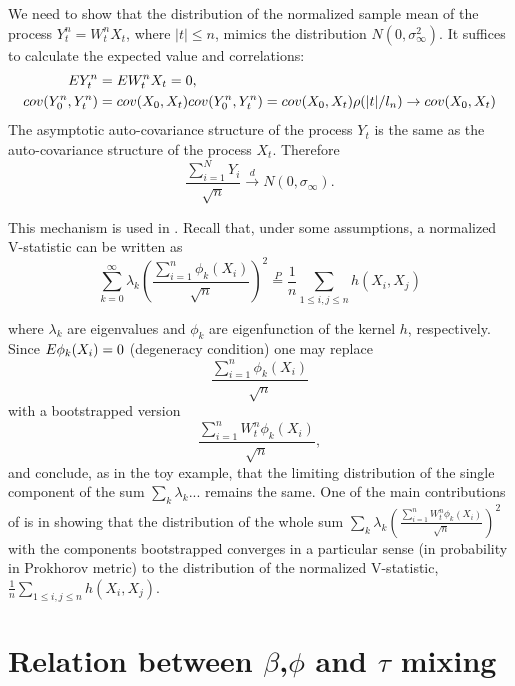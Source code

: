 We need to show that the distribution of the normalized sample mean of the process  $Y_t^{n} = W_t^{n}X_t$, where $|t| \leq n$, mimics the distribution $N(0,\sigma_{\infty}^2)$. It suffices to calculate the expected value and correlations:   
\begin{align}
E Y_t^{n} &= E W_t^n X_t = 0 ,\\
cov(Y_0^n,Y_t^n) &= cov(X_0,X_t)cov(Y_0^n,Y_t^n) = cov(X_0,X_t)\rho(|t|/l_n) \to cov(X_0,X_t)
\end{align}
The asymptotic auto-covariance structure of the process $Y_t$ is the same as the auto-covariance structure of the process $X_t$. Therefore 
\begin{equation}
\frac{\sum_{i=1}^{N} Y_i}{\sqrt{n}} \overset{d}{\to} N(0,\sigma_{\infty}).    
\end{equation}  

This mechanism is used in \cite{leucht_dependent_2013}. Recall that, under some assumptions, a normalized V-statistic can be written as 
$$
\sum_{k=0}^{\infty} \lambda_k  \left( \frac{ \sum_{i=1}^{n} \phi_k(X_i) } {\sqrt n}  \right)^2 \overset{P}{=} \frac 1  n \sum_{1\leq i,j \leq n} h(X_i,X_j) 
$$ 

where $\lambda_k$ are eigenvalues and $\phi_k$ are eigenfunction of the  kernel $h$, respectively.  Since $E  \phi_k(X_i) = 0$ (degeneracy condition) one may replace  
$$  \frac{ \sum_{i=1}^{n} \phi_k(X_i)} {\sqrt n} $$
with a bootstrapped version 
$$ \frac{  \sum_{i=1}^{n}  W_t^n \phi_k(X_i) } {\sqrt n}, $$  
and conclude, as in the toy example, that the limiting distribution of the single component of the sum $\sum_k \lambda_k  ...$  remains the same. One of the main  contributions of \cite{leucht_dependent_2013}  is in showing that the distribution of the whole sum $\sum_k \lambda_k \left(\frac{  \sum_{i=1}^{n}  W_t^n \phi_k(X_i) } {\sqrt n} \right)^2$ with the components bootstrapped  
converges in a particular sense (in  probability in Prokhorov metric) to the distribution of the normalized V-statistic, $\frac 1  n \sum_{1\leq i,j \leq n} h(X_i,X_j) $.



\section{Relation between $\beta$,$\phi$ and $\tau$ mixing}\label{append:differentMixing}


